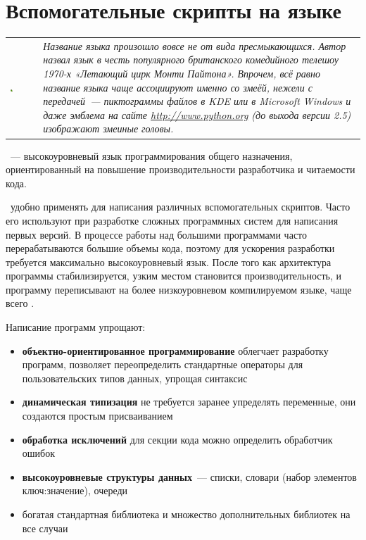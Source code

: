 \chapter{Вспомогательные скрипты на языке \py}

\begin{tabular}{p{} p{}}
\includegraphics[width=0.1\textwidth]{python/logo.png}&
\emph{
Название языка произошло вовсе не от вида пресмыкающихся. Автор назвал язык в
честь популярного британского комедийного телешоу 1970-х «Летающий цирк Монти
Пайтона». Впрочем, всё равно название языка чаще ассоциируют именно со змеёй,
нежели с передачей\ --- пиктограммы файлов в KDE или в Microsoft Windows и даже
эмблема на сайте \url{http://www.python.org} (до выхода версии 2.5) изображают
змеиные головы.
}
\\
\end{tabular}
\bigskip

\py{}\ --- высокоуровневый язык программирования общего
назначения, ориентированный на повышение производительности разработчика и
читаемости кода.

\py\ удобно применять для написания различных вспомогательных скриптов.
Часто его используют при разработке сложных программных систем для написания
первых версий. В процессе работы над большими программами часто перерабатываются
большие объемы кода, поэтому для ускорения разработки требуется максимально
высокоуровневый язык. После того как архитектура программы стабилизируется,
узким местом становится производительность, и программу переписывают на более
низкоуровневом компилируемом языке, чаще всего \cpp.

Написание программ упрощают:

\begin{itemize}
  \item \textbf{объектно-ориентированное программирование} облегчает разработку
  программ, позволяет переопределить стандартные операторы для пользовательских
  типов данных, упрощая синтаксис
  \item \textbf{динамическая типизация} не требуется заранее упределять
  переменные, они создаются простым присваиванием
  \item \textbf{обработка исключений} для секции кода можно определить
  обработчик ошибок
  \item \textbf{высокоуровневые структуры данных}\ --- списки, словари (набор
  элементов ключ:значение), очереди
  \item богатая стандартная библиотека и множество дополнительных библиотек на
  все случаи
\end{itemize}

